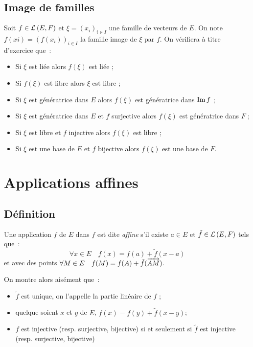 \subsection{Image de familles} 
Soit $f \in \mathcal{L}\left(E,F\right)$ et $\xi=(x_i)_{i \in I}$ une famille de vecteurs de $E$.
On note $f(xi) = (f(x_i))_{i \in I}$ la famille image de $\xi$ par $f$. On
vérifiera à titre d'exercice que~:
\begin{itemize}
    \item Si $\xi$ est liée alors $f(\xi)$ est liée ;
    \item Si $f(\xi)$ est libre alors $\xi$ est libre ;
    \item Si $\xi$ est génératrice dans $E$ alors $f(\xi)$ est génératrice dans
        $\operatorname{Im}{f}$ ;
    \item Si $\xi$ est génératrice dans $E$ et $f$ surjective alors $f(\xi)$ est
        génératrice dans $F$ ;
    \item Si $\xi$ est libre et $f$ injective alors $f(\xi)$ est libre ;
    \item Si $\xi$ est une base de $E$ et $f$ bijective alors $f(\xi)$ est une base de $F$.
\end{itemize}
%
\section{Applications affines}
\subsection{Définition}
\begin{defdef}
    Une application $f$ de $E$ dans $f$ est dite \emph{affine} s'il existe $a
    \in E$ et $\tilde{f} \in \mathcal{L}\left(E,F\right)$ tels que~:
    \begin{equation}
        \forall x \in E \quad f(x)=f(a)+\tilde{f}(x-a)
    \end{equation}
    et avec des points $\forall M \in E \quad f(M)=f(A)+ \tilde{f}(\overrightarrow{AM})$.
\end{defdef}

On montre alors aisément que~:
\begin{itemize}
    \item $\tilde{f}$ est unique, on l'appelle la partie linéaire de $f$ ;
    \item quelque soient $x$ et $y$ de $E$, $f(x)=f(y)+\tilde{f}(x-y)$;
    \item $f$ est injective (resp. surjective, bijective) si et seulement si
        $\tilde{f}$ est injective (resp. surjective, bijective)
\end{itemize}


